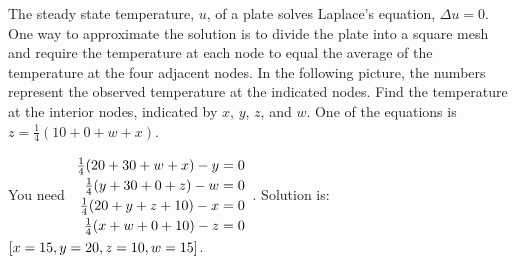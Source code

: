 \begin{ex}
  The steady state temperature, $u$, of a plate solves Laplace's
  equation, $\Delta u=0$. One way to approximate the solution is to
  divide the plate into a square mesh and require the temperature at
  each node to equal the average of the temperature at the four
  adjacent nodes. In the following picture, the numbers represent the
  observed temperature at the indicated nodes. Find the temperature at
  the interior nodes, indicated by $x$, $y$, $z$, and $w$. One of the
  equations is $z=\frac{1}{4}(10+0+w+x)$.

  \begin{center}
  \end{center}
  \begin{sol}
    You need $\def\arraystretch{1.2}
    \begin{array}{r}
      \frac{1}{4}(20+30+w+x) -y=0 \\
      \frac{1}{4}(y+30+0+z) -w=0 \\
      \frac{1}{4}(20+y+z+10) -x=0 \\
      \frac{1}{4}(x+w+0+10) -z=0
    \end{array}
    $. Solution is: $\left[x=15,y=20,z=10,w=15\right]$.
  \end{sol}
\end{ex}

